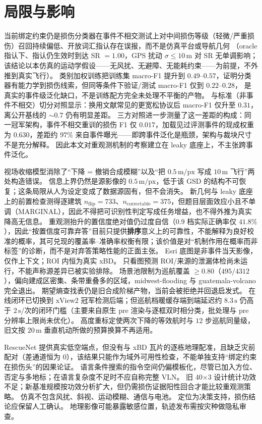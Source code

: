 \section{局限与影响}
\label{sec:limitations}

当前绑定约束仍是损伤分类器在事件不相交测试上对中间损伤等级（轻微/严重损伤）召回持续偏低、开放词汇指认存在误报，而不是仿真平台或导航几何
（oracle 指认下、指认仍生效时到达 SR $=1.00$，GPS 扰动 $\sigma\le 10\,\mathrm{m}$ 对 SR 无单调影响；该结论以本仿真的运动学假设——无风扰、无避障、无能耗约束——为前提，不外推到真实飞行）。
类别加权训练把训练集 macro-F1 提升到 $0.49$--$0.57$，证明分类器有能力学到损伤线索，但同等条件下验证/测试 macro-F1 仅到 $0.22$--$0.28$，
是真实的事件级泛化缺口，不是训练配方完全未处理不平衡的产物。
与标准（非事件不相交）切分对照显示：换用文献常见的更宽松协议后 macro-F1 仅升至 $0.31$，离公开基线的 $\sim 0.7$ 仍有明显差距。
三方对照进一步测量了这一差距的构成：同一冠军架构，事件不相交重训的损伤 F1 仅 $0.017$，加载见过评测事件的现成权重为 $0.630$，差距约 $97\%$ 来自事件曝光——即跨事件泛化是瓶颈，架构与裁块尺寸不是充分解释。
因此本文对重观测机制的考察建立在 leaky 底座上，不主张跨事件泛化。

视场收缩模型消除了``下降 = 撤销合成模糊''以及``把 $0.5\,\mathrm{m/px}$ 写成 $10\,\mathrm{m}$ 飞行''两处构造错误。
信息上界仍然是源影像的 $0.5\,\mathrm{m/px}$，低于该 GSD 的结构不可恢复；这条局限从人为设定变成了数据源固有，但不会消失。
新几何与 leaky 底座上的前置检查测得逐建筑 $n_{\mathrm{flip}}=733$、$n_{\mathrm{correctable}}=375$，但题目层面效应小且不单调（MARGINAL），因此不得把可识别性判定写成任务增益，也不得外推为真实降高无信息。
重观测抬升的置信度绝对值仍过度自信（$0.9$ 档实际正确率仅 $41.8\%$），因此``按置信度可靠弃答''目前只提供\textbf{排序}意义上的可靠性，不能解释为良好校准的概率，其可兑现的覆盖率--准确率权衡有限；该价值是对``机制作用在概率而非标签''的诊断，而不是对弃答策略性能的正面主张。
Esri 底图是非事件当天影像，仅作上下文；ROI 内恒为真实 xBD。
只看图预测 ROI/来源的泄漏体检尚未运行，不能声称源差异已被实验排除。
场景池限制为巡航覆盖 $\ge 0.80$（$495/4312$），偏向建成区密集、条带重叠多的区域，midwest-flooding 与 guatemala-volcano 完全退出。
期望熵查找表仍是旧合成阶梯产物，当前会被拒绝并回退启发式。
在线闭环已切换到 xView2 冠军检测后端；但巡航档暖缓存端到端延迟约 $8.3\,\mathrm{s}$ 仍高于 $2\,\mathrm{s}$/次的闭环门槛（主要来自原生 pre 渲染与逐框双时相分类，批处理与 pre 分辨率上限尚未优化）。
高度重标定使两次下降的等效航时与 $12$ 步巡航同量级，旧文按 $20\,\mathrm{m}$ 垂直机动所做的预算换算不再适用。

RescueNet 提供真实低空端点，但没有与 xBD 瓦片的逐栋地理配准，且缺乏灾前配对（差通道恒为 0），该结果只能作为域外可用性检查，不能单独支持``绑定约束在损伤头''的因果论证。
语言条件搜索的指令空间仍偏模板化，尽管已加入方位、否定与多地标；在语言复杂度不足时不应自称完整 VLN。
旧 40$\times$3 设计统计功效不足；新基准规模按功效分析扩大，但仍需损伤证据阳性回合才能比较重观测策略。
仿真不包含风扰、斜视、运动模糊、通信与电池。
\ProjectName 定位为决策支持，损伤结论应保留人工确认。
地理影像可能暴露敏感位置，轨迹发布需按灾种做隐私审查。
